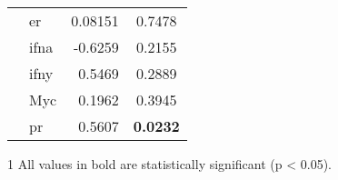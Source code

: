 \begin{table}[htpb]
\begin{threeparttable}
\begin{tabular}{llrc}
                                                                           & \gls{er}   & 0.08151   & 0.7478 \\
                                                                           & \gls{ifna} & -0.6259   & 0.2155 \\
                                                                           & \gls{ifny} & 0.5469    & 0.2889 \\
                                                                           & Myc        & 0.1962    & 0.3945 \\
                                                                           & \gls{pr}   & 0.5607    & \bfseries 0.0232  \\
				\hline
				\hline
			\end{tabular}
			\begin{tablenotes}
				\begin{footnotesize}
				\item [1] All values in bold are statistically significant (p \textless{} 0.05).
				\end{footnotesize}
			\end{tablenotes}
		\end{threeparttable}
	\end{table}

